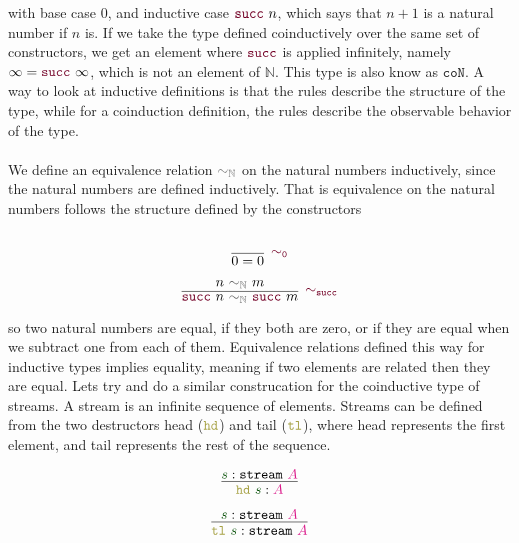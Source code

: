 \documentclass[twoside,11pt,openright]{report}
\theoremstyle{plain} %
\theoremstyle{definition}
\theoremstyle{remark}
\newcommand*{\term}[1]{\textcolor{green!30!black}{#1}} %
\newcommand*{\type}[1]{\textcolor{magenta!90!black}{#1}}
\newcommand*{\relation}[1]{\textcolor{gray!75!black}{\ensuremath{\mathtt{#1}}}}
\newcommand*{\constructor}[1]{\textcolor{purple!60!black}{\ensuremath{\mathtt{#1}}}}
\newcommand*{\destructor}[1]{\textcolor{yellow!60!black}{\ensuremath{\mathtt{#1}}}}
\newcommand*{\typeformer}[1]{\ensuremath{\mathtt{#1}}}
\begin{document}
with base case 0, and inductive case \(\constructor{succ}~n\), which says that \(n+1\) is a natural number if \(n\) is. If we take the type defined coinductively over the same set of constructors, we get an element where \(\constructor{succ}\) is applied infinitely, namely \(\infty = \constructor{succ}~\infty\), which is not an element of \(\mathbb{N}\). This type is also know as \(\mathtt{co}\mathtt{N}\). A way to look at inductive definitions is that the rules describe the structure of the type, while for a coinduction definition, the rules describe the observable behavior of the type.
\\ \\
We define an equivalence relation \(\relation{\sim_{\mathbb{N}}}\) on the natural numbers inductively, since the natural numbers are defined inductively. That is equivalence on the natural numbers follows the structure defined by the constructors \\[-10mm]
\begin{center}
  \strut
  \hfill
  \begin{minipage}{0.20\linewidth}
    \begin{equation}
      \vcenter{\infer[\constructor{\sim_{0}}]{0 = 0}{\strut}}
    \end{equation}
  \end{minipage}
  \hfill
  \begin{minipage}{0.35\linewidth}
    \begin{equation}
      \vcenter{\infer[\constructor{\sim_{succ}}]{\constructor{succ}~n~\relation{\sim_{\mathbb{N}}}~\constructor{succ}~m}{n~\relation{\sim_{\mathbb{N}}}~m}}
    \end{equation}
  \end{minipage}
  \hfill
  \strut
\end{center}
so two natural numbers are equal, if they both are zero, or if they are equal when we subtract one from each of them. Equivalence relations defined this way for inductive types implies equality, meaning if two elements are related then they are equal. Lets try and do a similar construcation for the coinductive type of streams. A stream is an infinite sequence of elements. Streams can be defined from the two destructors head (\(\destructor{hd}\)) and tail (\(\destructor{tl}\)), where head represents the first element, and tail represents the rest of the sequence.\\[-10mm]
\begin{center}
  \strut
  \hfill
  \begin{minipage}{0.225\linewidth}
    \begin{equation}
      \vcenter{\infer{\destructor{hd}~\term{s} : \type{A}}{\term{s} : \typeformer{stream}~\type{A}}}
    \end{equation}
  \end{minipage}
  \hfill
  \begin{minipage}{0.25\linewidth}
    \begin{equation}
      \vcenter{\infer{\destructor{tl}~\term{s}: \typeformer{stream}~\type{A}}{\term{s} : \typeformer{stream}~\type{A}}}
    \end{equation}
  \end{minipage}
  \hfill
  \strut
\end{center}
\end{document}
